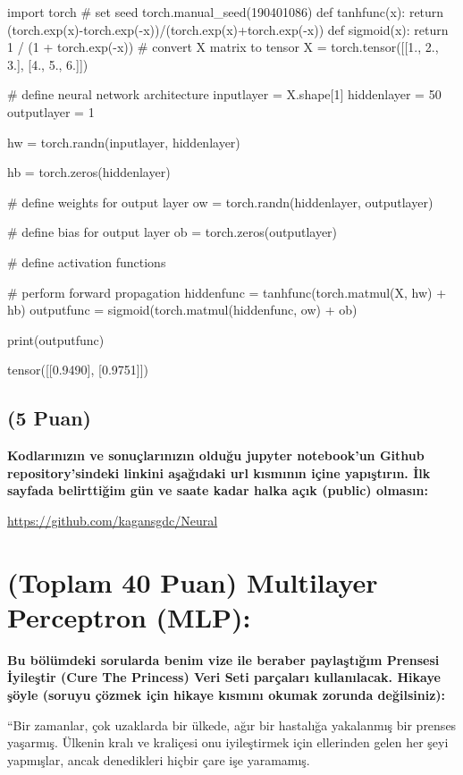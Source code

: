 \documentclass[11pt]{article}
\begin{document}
\begin{python}
import torch
# set seed
torch.manual_seed(190401086)
def tanhfunc(x):
    return (torch.exp(x)-torch.exp(-x))/(torch.exp(x)+torch.exp(-x))
def sigmoid(x):
    return 1 / (1 + torch.exp(-x))
# convert X matrix to tensor
X = torch.tensor([[1., 2., 3.], [4., 5., 6.]])

# define neural network architecture
inputlayer = X.shape[1]
hiddenlayer = 50
outputlayer = 1

hw = torch.randn(inputlayer, hiddenlayer)

hb = torch.zeros(hiddenlayer)

# define weights for output layer
ow = torch.randn(hiddenlayer, outputlayer)

# define bias for output layer
ob = torch.zeros(outputlayer)

# define activation functions

# perform forward propagation
hiddenfunc = tanhfunc(torch.matmul(X, hw) + hb)
outputfunc = sigmoid(torch.matmul(hiddenfunc, ow) + ob)

print(outputfunc)
\end{python}

tensor([[0.9490],
        [0.9751]])

\subsection{(5 Puan)} \textbf{Kodlarınızın ve sonuçlarınızın olduğu jupyter notebook'un Github repository'sindeki linkini aşağıdaki url kısmının içine yapıştırın. İlk sayfada belirttiğim gün ve saate kadar halka açık (public) olmasın:}

\url{https://github.com/kagansgdc/Neural}

\section{(Toplam 40 Puan) Multilayer Perceptron (MLP):} 
\textbf{Bu bölümdeki sorularda benim vize ile beraber paylaştığım Prensesi İyileştir (Cure The Princess) Veri Seti parçaları kullanılacak. Hikaye şöyle (soruyu çözmek için hikaye kısmını okumak zorunda değilsiniz):} 

``Bir zamanlar, çok uzaklarda bir ülkede, ağır bir hastalığa yakalanmış bir prenses yaşarmış. Ülkenin kralı ve kraliçesi onu iyileştirmek için ellerinden gelen her şeyi yapmışlar, ancak denedikleri hiçbir çare işe yaramamış.
\end{document}
